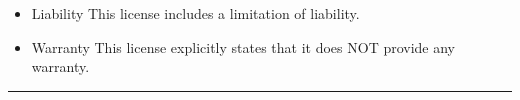 \documentclass[letterpaper,10pt,english]{sphinxmanual}
\begin{document}
\vspace{10px}

\begin{itemize}
\item {}
Liability \textendash{} This license includes a limitation of liability.

\item {}
Warranty \textendash{} This license explicitly states that it does NOT provide any warranty.

\end{itemize}

\begin{flushright}



\end{flushright}


\bigskip\hrule\bigskip
\end{document}
